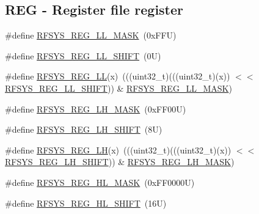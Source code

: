 \subsection*{R\+EG -\/ Register file register}
\begin{DoxyCompactItemize}
\item 
\#define \mbox{\hyperlink{group___r_f_s_y_s___register___masks_ga2fe64579aaef18ce266e3d6c316d3241}{R\+F\+S\+Y\+S\+\_\+\+R\+E\+G\+\_\+\+L\+L\+\_\+\+M\+A\+SK}}~(0x\+F\+F\+U)
\item 
\#define \mbox{\hyperlink{group___r_f_s_y_s___register___masks_gaab45c60c0a8e5edb59537ee2bcb2bbcf}{R\+F\+S\+Y\+S\+\_\+\+R\+E\+G\+\_\+\+L\+L\+\_\+\+S\+H\+I\+FT}}~(0\+U)
\item 
\#define \mbox{\hyperlink{group___r_f_s_y_s___register___masks_gaf197b94e2d03011c483dee604724cfda}{R\+F\+S\+Y\+S\+\_\+\+R\+E\+G\+\_\+\+LL}}(x)~(((uint32\+\_\+t)(((uint32\+\_\+t)(x)) $<$$<$ \mbox{\hyperlink{group___r_f_s_y_s___register___masks_gaab45c60c0a8e5edb59537ee2bcb2bbcf}{R\+F\+S\+Y\+S\+\_\+\+R\+E\+G\+\_\+\+L\+L\+\_\+\+S\+H\+I\+FT}})) \& \mbox{\hyperlink{group___r_f_s_y_s___register___masks_ga2fe64579aaef18ce266e3d6c316d3241}{R\+F\+S\+Y\+S\+\_\+\+R\+E\+G\+\_\+\+L\+L\+\_\+\+M\+A\+SK}})
\item 
\#define \mbox{\hyperlink{group___r_f_s_y_s___register___masks_ga9f8ddcb45324c34fd2d19417b8b13d11}{R\+F\+S\+Y\+S\+\_\+\+R\+E\+G\+\_\+\+L\+H\+\_\+\+M\+A\+SK}}~(0x\+F\+F00\+U)
\item 
\#define \mbox{\hyperlink{group___r_f_s_y_s___register___masks_gabe96c857aab7668805c1fb3ea46693bf}{R\+F\+S\+Y\+S\+\_\+\+R\+E\+G\+\_\+\+L\+H\+\_\+\+S\+H\+I\+FT}}~(8\+U)
\item 
\#define \mbox{\hyperlink{group___r_f_s_y_s___register___masks_ga9b8cd1814fd5957849b91bfd1bdf6ac6}{R\+F\+S\+Y\+S\+\_\+\+R\+E\+G\+\_\+\+LH}}(x)~(((uint32\+\_\+t)(((uint32\+\_\+t)(x)) $<$$<$ \mbox{\hyperlink{group___r_f_s_y_s___register___masks_gabe96c857aab7668805c1fb3ea46693bf}{R\+F\+S\+Y\+S\+\_\+\+R\+E\+G\+\_\+\+L\+H\+\_\+\+S\+H\+I\+FT}})) \& \mbox{\hyperlink{group___r_f_s_y_s___register___masks_ga9f8ddcb45324c34fd2d19417b8b13d11}{R\+F\+S\+Y\+S\+\_\+\+R\+E\+G\+\_\+\+L\+H\+\_\+\+M\+A\+SK}})
\item 
\#define \mbox{\hyperlink{group___r_f_s_y_s___register___masks_ga063f595b6c7267627c96048590611cc1}{R\+F\+S\+Y\+S\+\_\+\+R\+E\+G\+\_\+\+H\+L\+\_\+\+M\+A\+SK}}~(0x\+F\+F0000\+U)
\item 
\#define \mbox{\hyperlink{group___r_f_s_y_s___register___masks_gabc34a2d1963a697d1a773a8981a063f5}{R\+F\+S\+Y\+S\+\_\+\+R\+E\+G\+\_\+\+H\+L\+\_\+\+S\+H\+I\+FT}}~(16\+U)

\end{DoxyCompactItemize}

